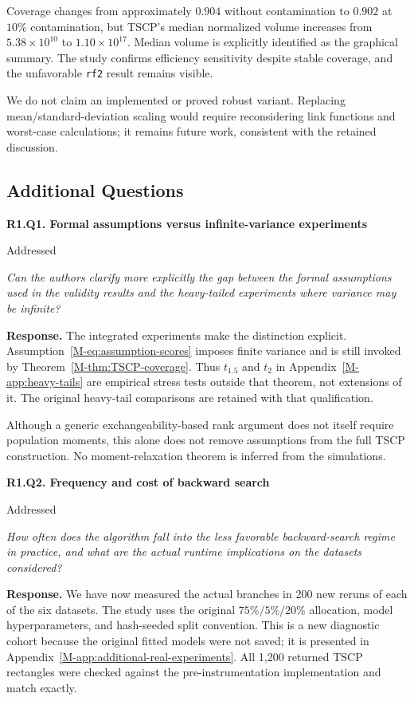 \documentclass[11pt]{article}
\newcommand{\msapp}[1]{Appendix~\ref*{M-#1}}
\newcommand{\point}[3]{\par\Needspace{7\baselineskip}\medskip
\noindent\parbox[t]{0.77\linewidth}{\textbf{#1}}\hfill
\parbox[t]{0.21\linewidth}{\raggedleft\small\sffamily #2}\par\nopagebreak
{\color{ReviewerBlue}\small\itshape #3\par}\textbf{Response.} }
\begin{document}
Coverage changes from approximately $0.904$ without contamination to $0.902$ at $10\%$ contamination, but TSCP's median normalized volume increases from $5.38\times10^{10}$ to $1.10\times10^{17}$. Median volume is explicitly identified as the graphical summary. The study confirms efficiency sensitivity despite stable coverage, and the unfavorable \texttt{rf2} result remains visible.

We do not claim an implemented or proved robust variant. Replacing mean/standard-deviation scaling would require reconsidering link functions and worst-case calculations; it remains future work, consistent with the retained discussion.

\subsection*{Additional Questions}

\point{R1.Q1. Formal assumptions versus infinite-variance experiments}{Addressed}{Can the authors clarify more explicitly the gap between the formal
assumptions used in the validity results and the heavy-tailed
experiments where variance may be infinite?}
\label{response:R1.Q1}
The integrated experiments make the distinction explicit. Assumption~\ref*{M-eq:assumption-scores} imposes finite variance and is still invoked by Theorem~\ref*{M-thm:TSCP-coverage}. Thus $t_{1.5}$ and $t_2$ in \msapp{app:heavy-tails} are empirical stress tests outside that theorem, not extensions of it. The original heavy-tail comparisons are retained with that qualification.

Although a generic exchangeability-based rank argument does not itself require population moments, this alone does not remove assumptions from the full TSCP construction. No moment-relaxation theorem is inferred from the simulations.

\point{R1.Q2. Frequency and cost of backward search}{Addressed}{How often does the algorithm fall into the less favorable
backward-search regime in practice, and what are the actual runtime
implications on the datasets considered?}
\label{response:R1.Q2}
We have now measured the actual branches in 200 new reruns of each of the six datasets. The study uses the original $75\%/5\%/20\%$ allocation, model hyperparameters, and hash-seeded split convention. This is a new diagnostic cohort because the original fitted models were not saved; it is presented in \msapp{app:additional-real-experiments}. All 1,200 returned TSCP rectangles were checked against the pre-instrumentation implementation and match exactly.
\end{document}
